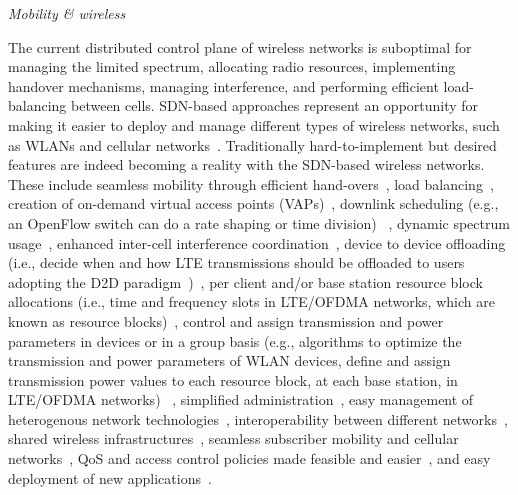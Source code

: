 \vspace{2mm}
\noindent \textit{Mobility \& wireless}

The current distributed control plane of wireless networks is suboptimal for managing the limited 
spectrum, allocating radio resources, implementing handover mechanisms, managing interference, and performing efficient load-balancing between cells.
SDN-based approaches represent an opportunity for making it easier to deploy and manage different types of wireless networks, such as WLANs and cellular 
networks~\cite{schulz-zander2014-atc,yap2010-1,ali-ahmad2013,gudipati2013,li2012,jin2013}.
Traditionally hard-to-implement but desired features are indeed becoming a reality with the SDN-based wireless networks. 
These include seamless mobility through efficient hand-overs~\cite{schulz-zander2014-atc,dely2011,li2012}, load balancing~\cite{schulz-zander2014-atc,gudipati2013}, creation of on-demand virtual access points (VAPs)~\cite{schulz-zander2014-atc,vestin2013}, downlink scheduling (e.g., an OpenFlow switch can do a rate shaping or time division) ~\cite{vestin2013}, dynamic spectrum usage~\cite{vestin2013}, enhanced inter-cell 
interference coordination~\cite{vestin2013,li2012}, device to device offloading (i.e., decide when and how LTE transmissions should be offloaded to users adopting the D2D paradigm~\cite{yang2013d2d})~\cite{ali-ahmad2013}, per client and/or base station resource block allocations (i.e.,  time and frequency slots in LTE/OFDMA networks, which are known as resource blocks)~\cite{gudipati2013,ali-ahmad2013,jin2013}, control and assign 
transmission and power parameters in devices or in a group basis (e.g., algorithms to optimize the transmission and power parameters of WLAN devices, define and assign transmission power values to each resource block, at each base station, in LTE/OFDMA networks) ~\cite{ali-ahmad2013,gudipati2013}, simplified administration~\cite{schulz-zander2014-atc,yap2010-1,gudipati2013}, easy management of heterogenous network technologies~\cite{yap2010-1,gudipati2013,yap2010-2}, interoperability between different networks~\cite{yap2010-2,jin2013}, shared wireless infrastructures~\cite{yap2010-2}, seamless subscriber mobility and cellular networks~\cite{li2012}, QoS and access control policies made feasible and easier~\cite{li2012,jin2013}, and easy deployment of new applications~\cite{schulz-zander2014-atc,gudipati2013,yap2010-2}. 

